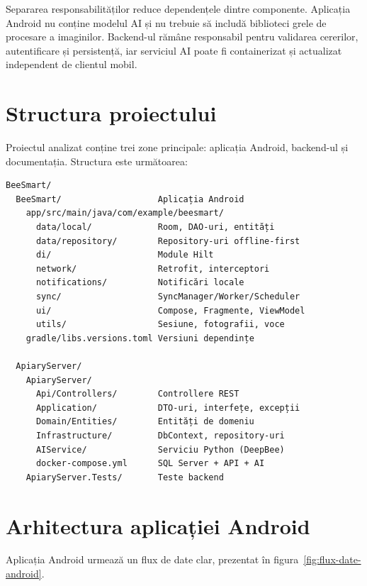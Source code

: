 Separarea responsabilităților reduce dependențele dintre componente. Aplicația Android nu conține modelul AI și nu trebuie să includă biblioteci grele de procesare a imaginilor. Backend-ul rămâne responsabil pentru validarea cererilor, autentificare și persistență, iar serviciul AI poate fi containerizat și actualizat independent de clientul mobil.



\section{Structura proiectului}

Proiectul analizat conține trei zone principale: aplicația Android, backend-ul și documentația. Structura este următoarea:

{\footnotesize
\begin{verbatim}
BeeSmart/
  BeeSmart/                   Aplicația Android
    app/src/main/java/com/example/beesmart/
      data/local/             Room, DAO-uri, entități
      data/repository/        Repository-uri offline-first
      di/                     Module Hilt
      network/                Retrofit, interceptori
      notifications/          Notificări locale
      sync/                   SyncManager/Worker/Scheduler
      ui/                     Compose, Fragmente, ViewModel
      utils/                  Sesiune, fotografii, voce
    gradle/libs.versions.toml Versiuni dependințe

  ApiaryServer/
    ApiaryServer/
      Api/Controllers/        Controllere REST
      Application/            DTO-uri, interfețe, excepții
      Domain/Entities/        Entități de domeniu
      Infrastructure/         DbContext, repository-uri
      AIService/              Serviciu Python (DeepBee)
      docker-compose.yml      SQL Server + API + AI
    ApiaryServer.Tests/       Teste backend
\end{verbatim}
}

\section{Arhitectura aplicației Android}

Aplicația Android urmează un flux de date clar, prezentat în figura~\ref{fig:flux-date-android}.

